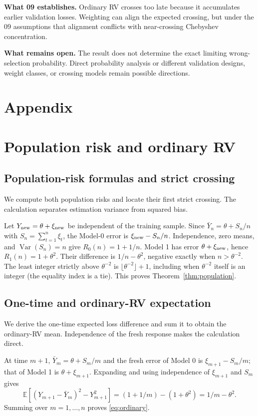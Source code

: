 \documentclass[11pt]{article}
\theoremstyle{definition}
\begin{document}
\noindent\textbf{What 09 establishes.}
Ordinary RV crosses too late because it accumulates earlier
validation losses. Weighting can align the expected crossing,
but under the 09 assumptions that alignment conflicts with
near-crossing Chebyshev concentration.

\noindent\textbf{What remains open.}
The result does not determine the exact limiting
wrong-selection probability. Direct probability analysis or
different validation designs, weight classes, or crossing
models remain possible directions.

\appendix
\section*{Appendix}
\section{Population risk and ordinary RV}

\subsection{Population-risk formulas and strict crossing}\label{app:pop}
We compute both population risks and locate their first strict crossing. The calculation separates estimation variance from squared bias.

Let $Y_{\rm new}=\theta+\xi_{\rm new}$ be independent of the training sample. Since $\bar Y_n=\theta+S_n/n$ with $S_n=\sum_{t=1}^n\xi_t$, the Model-0 error is $\xi_{\rm new}-S_n/n$. Independence, zero means, and $\operatorname{Var}(S_n)=n$ give $R_0(n)=1+1/n$. Model 1 has error $\theta+\xi_{\rm new}$, hence $R_1(n)=1+\theta^2$. Their difference is $1/n-\theta^2$, negative exactly when $n>\theta^{-2}$. The least integer strictly above $\theta^{-2}$ is $\lfloor\theta^{-2}\rfloor+1$, including when $\theta^{-2}$ itself is an integer (the equality index is a tie). This proves Theorem~\ref{thm:population}.

\subsection{One-time and ordinary-RV expectation}\label{app:ordinary-mean}
We derive the one-time expected loss difference and sum it to obtain the ordinary-RV mean. Independence of the fresh response makes the calculation direct.

At time $m+1$, $\bar Y_m=\theta+S_m/m$ and the fresh error of Model 0 is $\xi_{m+1}-S_m/m$; that of Model 1 is $\theta+\xi_{m+1}$. Expanding and using independence of $\xi_{m+1}$ and $S_m$ gives
\[
\mathbb E[(Y_{m+1}-\bar Y_m)^2-Y_{m+1}^2]
=(1+1/m)-(1+\theta^2)=1/m-\theta^2.
\]
Summing over $m=1,\ldots,n$ proves \eqref{eq:ordinary}.
\end{document}
